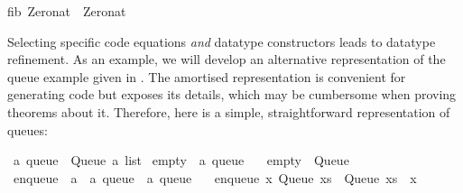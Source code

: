 \begin{isabellebody}
\begin{isamarkuptext}
fib\ Zero{}nat\ {}\ Zero{}nat{}\isanewline%
\end{isamarkuptext}%
\isamarkuptrue%
%
\endisatagquotetypewriter
{\isafoldquotetypewriter}%
%
\isadelimquotetypewriter
%
\endisadelimquotetypewriter
%
\isamarkuptrue%
%
\begin{isamarkuptext}%
Selecting specific code equations \emph{and} datatype constructors
  leads to datatype refinement.  As an example, we will develop an
  alternative representation of the queue example given in
  .  The amortised representation is
  convenient for generating code but exposes its 
  details, which may be cumbersome when proving theorems about it.
  Therefore, here is a simple, straightforward representation of
  queues:%
\end{isamarkuptext}%
\isamarkuptrue%
%
\isadelimquote
%
\endisadelimquote
%
\isatagquote
{}\isamarkupfalse%
\ {}a\ queue\ {}\ Queue\ {}{}a\ list{}\isanewline
\isanewline
{}\isamarkupfalse%
\ empty\ {}{}\ {}{}a\ queue{}\ \isanewline
\ \ {}empty\ {}\ Queue\ {}{}{}\isanewline
\isanewline
{}\isamarkupfalse%
\ enqueue\ {}{}\ {}{}a\ {}\ {}a\ queue\ {}\ {}a\ queue{}\ \isanewline
\ \ {}enqueue\ x\ {}Queue\ xs{}\ {}\ Queue\ {}xs\ {}\ {}x{}{}{}\isanewline

\end{isabellebody}
